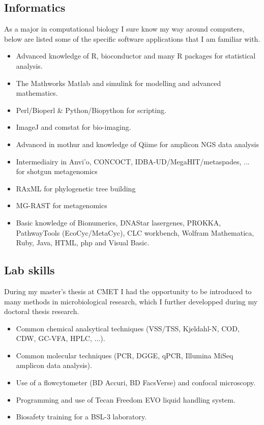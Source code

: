 \documentclass[a4paper,11pt,oneside]{article}
\begin{document}
\subsection*{Informatics}
As a major in computational biology I sure know my way around computers, below are listed some of the specific software applications that I am familiar with.
\begin{itemize}
	\item Advanced knowledge of R, bioconductor and many R packages for statistical analysis.
	\item The Mathworks Matlab and simulink for modelling and advanced mathematics.
	\item Perl/Bioperl \& Python/Biopython for scripting.
	\item ImageJ and comstat for bio-imaging.
  \item Advanced in mothur and knowledge of Qiime for amplicon NGS data analysis
  \item Intermediairy in Anvi'o, CONCOCT, IDBA-UD/MegaHIT/metaspades, ... for shotgun metagenomics
  \item RAxML for phylogenetic tree building
  \item MG-RAST for metagenomics
	\item Basic knowledge of Bionumerics, DNAStar lasergenes, PROKKA, PathwayTools (EcoCyc/MetaCyc), CLC workbench, Wolfram Mathematica,  Ruby, Java, HTML, php and Visual Basic.
\end{itemize}
\subsection*{Lab skills}
During my master's thesis at CMET I had the opportunity to be introduced to many methods in microbiological research, which I further developped during my doctoral thesis research.
\begin{itemize}
	\item Common chemical analsytical techniques (VSS/TSS, Kjeldahl-N, COD, CDW, GC-VFA, HPLC, $\ldots$).
	\item Common molecular techniques (PCR, DGGE, qPCR, Illumina MiSeq amplicon data analysis).
	\item Use of a flowcytometer (BD Accuri, BD FacsVerse) and confocal microscopy.
  \item Programming and use of Tecan Freedom EVO liquid handling system.
	\item Biosafety training for a BSL-3 laboratory.
\end{itemize}
\end{document}
